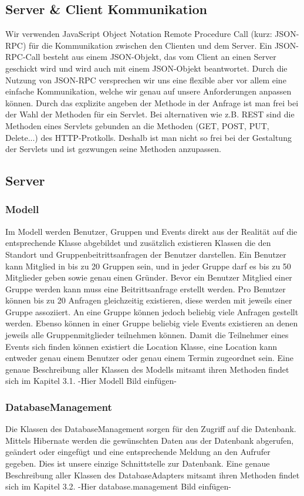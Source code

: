 	\subsection{Server \& Client Kommunikation}
	Wir verwenden JavaScript Object Notation Remote Procedure Call (kurz: JSON-RPC) für die Kommunikation zwischen den Clienten und dem Server.
	Ein JSON-RPC-Call besteht aus einem JSON-Objekt, das vom Client an einen Server geschickt wird und wird auch mit einem JSON-Objekt beantwortet.
	Durch die Nutzung von JSON-RPC versprechen wir uns eine flexible aber vor allem eine einfache Kommunikation, welche wir genau auf unsere 		Anforderungen anpassen können.
Durch das explizite angeben der Methode in der Anfrage ist man frei bei der Wahl der Methoden für ein Servlet. Bei alternativen wie z.B. REST sind die Methoden eines Servlets gebunden an die Methoden (GET, POST, PUT, Delete...) des HTTP-Protkolls. Deshalb ist man nicht so frei bei der Gestaltung der Servlets und ist gezwungen seine Methoden anzupassen.
	
	\subsection{Server}
	\subsubsection{Modell}
Im Modell werden Benutzer, Gruppen und Events direkt aus der Realität auf die entsprechende Klasse abgebildet und zusätzlich existieren Klassen die den Standort und Gruppenbeitrittsanfragen der Benutzer darstellen.
Ein Benutzer kann Mitglied in bis zu 20 Gruppen sein, und in jeder Gruppe darf es bis zu 50 Mitglieder geben sowie genau einen Gründer. Bevor ein Benutzer Mitglied einer Gruppe werden kann muss eine Beitrittsanfrage erstellt werden.
Pro Benutzer können bis zu 20 Anfragen gleichzeitig existieren, diese werden mit jeweils einer Gruppe assoziiert.
An eine Gruppe können jedoch beliebig viele Anfragen gestellt werden.
Ebenso können in einer Gruppe beliebig viele Events existieren an denen jeweils alle Gruppenmitglieder teilnehmen können.
Damit die Teilnehmer eines Events sich finden können existiert die Location Klasse, eine Location kann entweder genau einem Benutzer oder genau einem Termin zugeordnet sein. 
Eine genaue Beschreibung aller Klassen des Modells mitsamt ihren Methoden findet sich im Kapitel 3.1.
-Hier Modell Bild einfügen-

	\subsubsection{DatabaseManagement}
	Die Klassen des DatabaseManagement sorgen für den Zugriff auf die Datenbank.
	Mittels Hibernate werden die gewünschten Daten aus der Datenbank abgerufen, geändert oder eingefügt und eine entsprechende Meldung an den Aufrufer gegeben.
	Dies ist unsere einzige Schnittstelle zur Datenbank.	
	Eine genaue Beschreibung aller Klassen des DatabaseAdapters mitsamt ihren Methoden findet sich im Kapitel 3.2.
-Hier database.management Bild einfügen-


